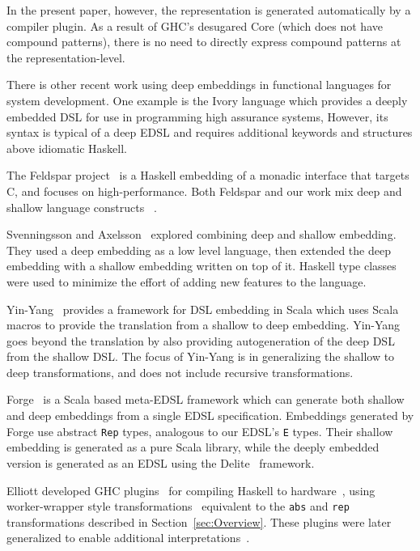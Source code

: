 \documentclass[sigplan,anonymous,review]{acmart}
\begin{document}
In the present paper, however, the representation is generated automatically by
a compiler plugin. As a result of GHC's desugared Core (which does not have
compound patterns), there is no need to directly express compound patterns at
the representation-level.

There is other recent work using deep embeddings in functional languages for 
system development.  One example is the Ivory language \cite{Elliott2015-Ivory} 
which provides a deeply embedded DSL for use in programming high assurance
systems,  However, its syntax is typical of a deep EDSL and requires additional
keywords and structures above idiomatic Haskell. 

The Feldspar project~\cite{Axelsson:10:Feldspar,Svenningsson:13:Combining}
is a Haskell embedding of a monadic interface
that targets C, and focuses on high-performance.  Both Feldspar and our work
mix deep and shallow language constructs ~\cite{Persson:11:MonadicDSL,Svenningsson:13:Compositional,Sculthorpe:13:ConstrainedMonad}.

Svenningsson and Axelsson~\cite{Svenningsson:13:Combining}
explored combining deep and shallow embedding.  They used
a deep embedding as a low level language, then extended
the deep embedding with a shallow embedding written on top
of it. Haskell type classes were used to minimize the effort of adding
new features to the language.

Yin-Yang~\cite{Jovanovic:2014} provides a framework for DSL
embedding in Scala which uses Scala macros to provide the 
translation from a shallow to deep embedding.  Yin-Yang
goes beyond the translation by also providing autogeneration
of the deep DSL from the shallow DSL.  The focus of
Yin-Yang is in generalizing the shallow to deep transformations,
and does not include recursive transformations.

Forge~\cite{Sujeeth:2013} is a Scala based meta-EDSL framework
which can generate both shallow and deep embeddings from
a single EDSL specification.  Embeddings generated by Forge
use abstract \verb|Rep| types, analogous to our EDSL's 
\verb|E| types.  Their shallow embedding is generated
as a pure Scala library, while the deeply embedded version
is generated as an EDSL using the Delite~\cite{Sujeeth:2014}
framework.

Elliott developed GHC plugins~\cite{github:lambda-ccc}\cite{github:reification-rules}
for compiling Haskell to hardware~\cite{github:Elliott:Talk:2015},
using worker-wrapper style transformations~\cite{Gill:09:WW}
equivalent to the \verb|abs| and
\verb|rep| transformations described in Section~\ref{sec:Overview}. These plugins were later generalized to enable additional interpretations~\cite{Elliott:2017}.
\end{document}
